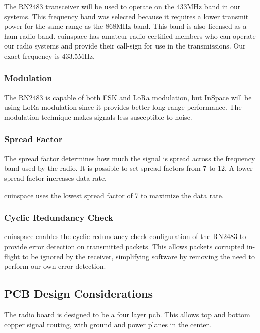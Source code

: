 The RN2483 transceiver will be used to operate on the 433MHz band in our systems. This frequency band was selected
because it requires a lower transmit power for the same range \cite[Table 2-5]{rn2483-datasheet} as the 868MHz band.
This band is also licensed as a \gls{ham-radio} band. \Gls{cuinspace} has amateur radio certified members who can
operate our radio systems and provide their call-sign for use in the transmissions. Our exact frequency is 433.5MHz.

\subsubsection{Modulation}

The RN2483 is capable of both FSK and LoRa modulation, but InSpace will be using LoRa modulation since it provides
better long-range performance. The modulation technique makes signals less susceptible to noise.

\subsubsection{Spread Factor}

The spread factor determines how much the signal is spread across the frequency band used by the radio. It is possible
to set spread factors from 7 to 12. \cite[Sec. 2.5.5.14]{rn2483-commands} A lower spread factor increases data rate.

\Gls{cuinspace} uses the lowest spread factor of 7 to maximize the data rate.

\subsubsection{Cyclic Redundancy Check}

\Gls{cuinspace} enables the cyclic redundancy check configuration of the RN2483 to provide error detection on
transmitted packets. This allows packets corrupted in-flight to be ignored by the receiver, simplifying software by
removing the need to perform our own error detection.

\subsection{PCB Design Considerations}

The radio board is designed to be a four layer \gls{pcb}. This allows top and bottom copper signal routing, with ground
and power planes in the center.

